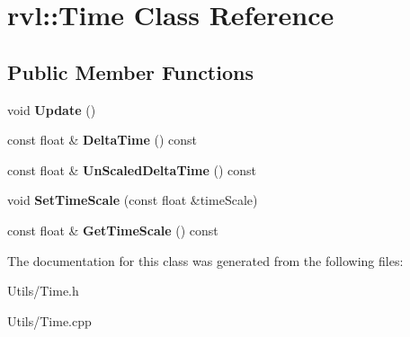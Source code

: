 \hypertarget{classrvl_1_1_time}{}\section{rvl\+:\+:Time Class Reference}
\label{classrvl_1_1_time}
\subsection*{Public Member Functions}
\begin{DoxyCompactItemize}
\item 
\mbox{\label{classrvl_1_1_time_ad22605375fc2a775f10fb80242fab9a7}} 
void {\bfseries Update} ()
\item 
\mbox{\label{classrvl_1_1_time_a615b7d43aa2832dd6ffb235de22044cc}} 
const float \& {\bfseries Delta\+Time} () const
\item 
\mbox{\label{classrvl_1_1_time_a2edf11a18558efa227b3170eae433b3c}} 
const float \& {\bfseries Un\+Scaled\+Delta\+Time} () const
\item 
\mbox{\label{classrvl_1_1_time_a6033a29cb79140a95337f78fe3de4f8a}} 
void {\bfseries Set\+Time\+Scale} (const float \&time\+Scale)
\item 
\mbox{\label{classrvl_1_1_time_adc601517b317a98bc72a1dd87826ae4e}} 
const float \& {\bfseries Get\+Time\+Scale} () const
\end{DoxyCompactItemize}


The documentation for this class was generated from the following files\+:\begin{DoxyCompactItemize}
\item 
Utils/Time.\+h\item 
Utils/Time.\+cpp\end{DoxyCompactItemize}
